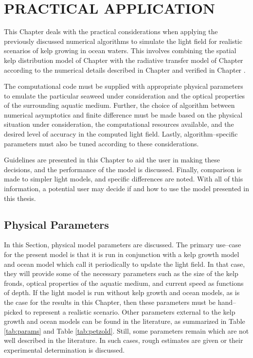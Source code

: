 \chapter{PRACTICAL APPLICATION}
\label{chap:application}

This Chapter deals with the practical considerations when applying the previously discussed numerical algorithms to simulate the light field for realistic scenarios of kelp growing in ocean waters.
This involves combining the spatial kelp distribution model of Chapter \Rom{\ref{chap:kelp}} with the radiative transfer model of Chapter \Rom{\ref{chap:light}} according to the numerical details described in Chapter \Rom{\ref{chap:numerical}} and verified in Chapter \Rom{\ref{chap:model_analysis}}.

The computational code must be supplied with appropriate physical parameters to emulate the particular seaweed under consideration and the optical properties of the surrounding aquatic medium.
Further, the choice of algorithm between numerical asymptotics and finite difference must be made based on the physical situation under consideration, the computational resources available, and the desired level of accuracy in the computed light field.
Lastly, algorithm--specific parameters must also be tuned according to these considerations.

Guidelines are presented in this Chapter to aid the user in making these decisions, and the performance of the model is discussed.
Finally, comparison is made to simpler light models, and specific differences are noted.
With all of this information, a potential user may decide if and how to use the model presented in this thesis.

\section{Physical Parameters}
\label{sec:parameters}
In this Section, physical model parameters are discussed.
The primary use--case for the present model is that it is run in conjunction with a kelp growth model and ocean model
which call it periodically to update the light field.
In that case, they will provide some of the necessary parameters such as the size of the kelp fronds, optical properties of the aquatic medium, and current speed as functions of depth.
If the light model is run without kelp growth and ocean models, as is the case for the results in this Chapter, then these parameters must be hand--picked to represent a realistic scenario.
Other parameters external to the kelp growth and ocean models can be found in the literature,
as summarized in Table \ref{tab:params} and Table \ref{tab:petzold}.
Still, some parameters remain which are not well described in the literature.
In such cases, rough estimates are given or their experimental determination is discussed.

